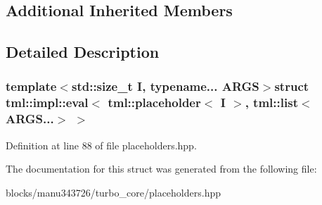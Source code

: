 \subsection*{Additional Inherited Members}


\subsection{Detailed Description}
\subsubsection*{template$<$std\+::size\+\_\+t I, typename... A\+R\+G\+S$>$struct tml\+::impl\+::eval$<$ tml\+::placeholder$<$ I $>$, tml\+::list$<$ A\+R\+G\+S...$>$ $>$}



Definition at line 88 of file placeholders.\+hpp.



The documentation for this struct was generated from the following file\+:\begin{DoxyCompactItemize}
\item 
blocks/manu343726/turbo\+\_\+core/placeholders.\+hpp\end{DoxyCompactItemize}
